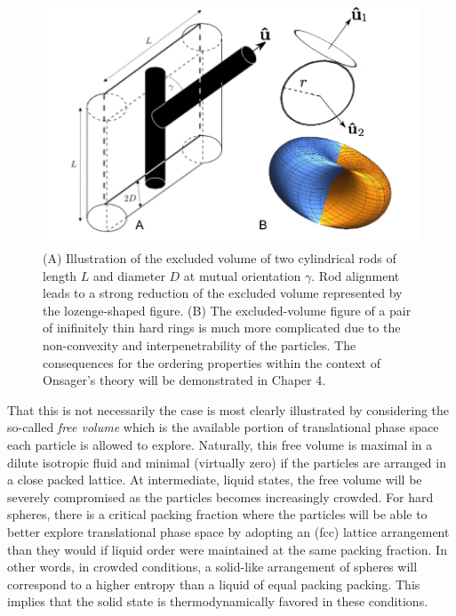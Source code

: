 \documentclass[amssymb]{revtex4}
\begin{document}
\begin{figure}
\begin{center}
\includegraphics[width= 0.7 \columnwidth]{rodin}
\caption{ \label{introfig3} (A) Illustration of the excluded volume of two cylindrical rods  of length $L$ and diameter $D$ at mutual orientation $\gamma$. Rod alignment leads to a strong reduction of the excluded volume represented by the lozenge-shaped figure. (B) The excluded-volume figure of a pair of inifinitely thin hard rings is much more complicated due to the non-convexity and interpenetrability of the particles.  The consequences for the ordering properties within the context of Onsager's theory will be demonstrated in Chaper 4.}
\end{center}
\end{figure}

That this is not necessarily the case is most clearly illustrated by considering the so-called {\em free volume}  which is the available portion of translational phase space each particle is allowed to explore. Naturally, this free volume is maximal in a dilute isotropic fluid and minimal (virtually zero) if the particles are arranged in a close packed lattice. At intermediate, liquid states,  the free volume will be severely compromised as the particles becomes increasingly crowded.  For hard spheres, there is a critical packing fraction where the particles will be able to better explore translational phase space by adopting an (fcc) lattice arrangement than they would if liquid order were maintained at the same packing fraction. In other words, in crowded conditions,  a solid-like arrangement of spheres will correspond to a higher entropy than a liquid of equal packing packing. This implies that the solid state is thermodynamically favored in these conditions.    
\end{document}
